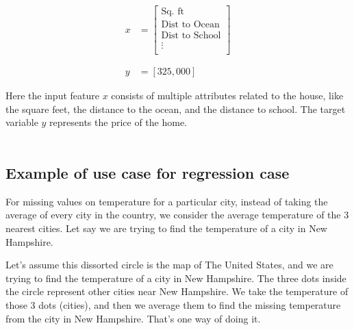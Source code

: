 \begin{align*}
    x &= \begin{bmatrix}
            \text{Sq. ft} \\
            \text{Dist to Ocean} \\
            \text{Dist to School} \\
            \vdots \\
         \end{bmatrix} \\\\\\
    y &= [325,000]
\end{align*}

Here the input feature $x$ consists of multiple attributes related to the house,
like the  square feet, the distance to the ocean, and the distance to school. The target
variable $y$ represents the price of the home.\\\\

\subsection{Example of use case for regression case}

For missing values on temperature for a particular city, instead of
taking the average of every city in the country, we consider the average
temperature of the 3 nearest cities. Let say we are trying to find the temperature
of a city in New Hampshire.

\begin{center}
\end{center}

Let's assume this dissorted circle is the map of The United States, and we are trying
to find the temperature of a city in New Hampshire. The three dots inside the circle
represent other cities near New Hampshire. We take the temperature of those 3 dots (cities),
and then we average them to find the missing temperature from the city in New Hampshire. That's one
way of doing it.

